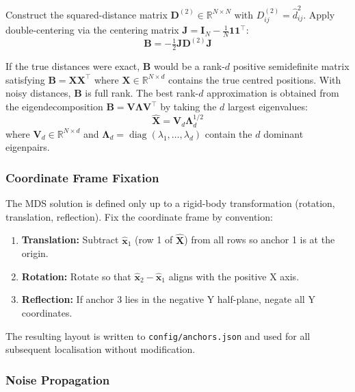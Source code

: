 \documentclass[11pt,a4paper]{article}
\newcommand{\vect}[1]{\bm{#1}}
\newcommand{\mat}[1]{\mathbf{#1}}
\newcommand{\Trans}{^{\top}}
\newcommand{\R}{\mathbb{R}}
\DeclareMathOperator{\diag}{diag}
\begin{document}
Construct the squared-distance matrix $\mat{D}^{(2)} \in \R^{N \times N}$ with $D^{(2)}_{ij} = \hat{d}_{ij}^2$. Apply double-centering via the centering matrix $\mat{J} = \mat{I}_N - \frac{1}{N}\vect{1}\vect{1}\Trans$:
\begin{equation}
\mat{B} = -\tfrac{1}{2} \mat{J} \mat{D}^{(2)} \mat{J}
\label{eq:mds}
\end{equation}

If the true distances were exact, $\mat{B}$ would be a rank-$d$ positive semidefinite matrix satisfying $\mat{B} = \mat{X}\mat{X}\Trans$ where $\mat{X} \in \R^{N \times d}$ contains the true centred positions. With noisy distances, $\mat{B}$ is full rank. The best rank-$d$ approximation is obtained from the eigendecomposition $\mat{B} = \mat{V}\mat{\Lambda}\mat{V}\Trans$ by taking the $d$ largest eigenvalues:
\begin{equation}
\hat{\mat{X}} = \mat{V}_d \mat{\Lambda}_d^{1/2}
\label{eq:mdssoln}
\end{equation}
where $\mat{V}_d \in \R^{N \times d}$ and $\mat{\Lambda}_d = \diag(\lambda_1, \ldots, \lambda_d)$ contain the $d$ dominant eigenpairs.

\subsubsection{Coordinate Frame Fixation}

The MDS solution is defined only up to a rigid-body transformation (rotation, translation, reflection). Fix the coordinate frame by convention:
\begin{enumerate}[leftmargin=2em]
  \item \textbf{Translation:} Subtract $\hat{\vect{x}}_1$ (row 1 of $\hat{\mat{X}}$) from all rows so anchor 1 is at the origin.
  \item \textbf{Rotation:} Rotate so that $\hat{\vect{x}}_2 - \hat{\vect{x}}_1$ aligns with the positive X axis.
  \item \textbf{Reflection:} If anchor 3 lies in the negative Y half-plane, negate all Y coordinates.
\end{enumerate}

The resulting layout is written to \texttt{config/anchors.json} and used for all subsequent localisation without modification.

\subsubsection{Noise Propagation}
\end{document}
